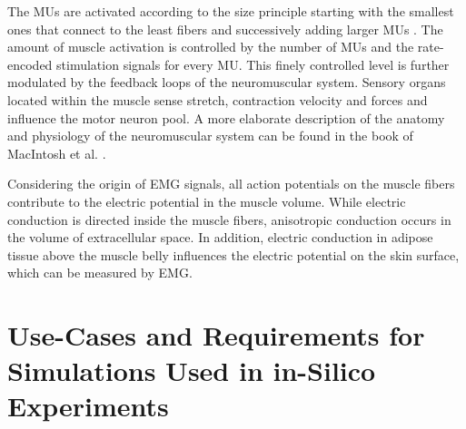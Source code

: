 

The MUs are activated according to the size principle starting with the smallest ones that connect to the least fibers and successively adding larger MUs \cite{Milner-Brown1973b}. The amount of muscle activation is controlled by the number of MUs and the rate-encoded stimulation signals for every MU. This finely controlled level is further modulated by the feedback loops of the neuromuscular system. Sensory organs located within the muscle sense stretch, contraction velocity and forces and influence the motor neuron pool.
A more elaborate description of the anatomy and physiology of the neuromuscular system can be found in the book of MacIntosh et al. \cite{macintosh2006skeletal}.

Considering the origin of EMG signals, all action potentials on the muscle fibers contribute to the electric potential in the muscle volume. While electric conduction is directed inside the muscle fibers, anisotropic conduction occurs in the volume of extracellular space. In addition, electric conduction in adipose tissue above the muscle belly influences the electric potential on the skin surface, which can be measured by EMG.

\section{ Use-Cases and Requirements for Simulations Used in in-Silico Experiments}\label{sec:challenges_in_silico}

